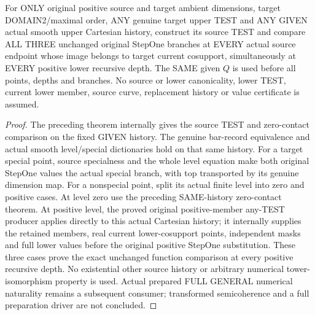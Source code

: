 \begin{theorem}
\label{hir:original-given-upper-cartesian-all-stepone-values}
\leanok
For ONLY original positive source and target ambient dimensions, target
DOMAIN2/maximal order, ANY genuine target upper TEST and ANY GIVEN actual
smooth upper Cartesian history, construct its source TEST and compare ALL
THREE unchanged original StepOne branches at EVERY actual source endpoint
whose image belongs to target current cosupport, simultaneously at EVERY
positive lower recursive depth. The SAME given $Q$ is used before all
points, depths and branches. No source or lower canonicality, lower TEST,
current lower member, source curve, replacement history or value
certificate is assumed.
\end{theorem}
\begin{proof}
The preceding theorem internally gives the source TEST and zero-contact
comparison on the fixed GIVEN history. The genuine bar-record equivalence
and actual smooth level/special dictionaries hold on that same history.
For a target special point, source specialness and the whole level equation
make both original StepOne values the actual special branch, with top
transported by its genuine dimension map. For a nonspecial point, split
its actual finite level into zero and positive cases. At level zero use
the preceding SAME-history zero-contact theorem. At positive level, the
proved original positive-member any-TEST producer applies directly to
this actual Cartesian history; it internally supplies the retained
members, real current lower-cosupport points, independent masks and full
lower values before the original positive StepOne substitution. These
three cases prove the exact unchanged function comparison at every
positive recursive depth. No existential other source history or arbitrary
numerical tower-isomorphism property is used. Actual prepared FULL GENERAL
numerical naturality remains a subsequent consumer; transformed
semicoherence and a full preparation driver are not concluded.
\end{proof}
